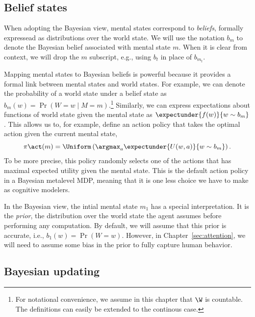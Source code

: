 \subsection{Belief states}

When adopting the Bayesian view, mental states correspond to \emph{beliefs}, formally expressead as distributions over the world state. We will use the notation $b_m$ to denote the Bayesian belief associated with mental state $m$. When it is clear from context, we will drop the $m$ subscript, e.g., using $b_t$ in place of $b_{m_t}$. 

Mapping mental states to Bayesian beliefs is powerful because it provides a formal link between mental states and world states. For example, we can denote the probability of a world state under a belief state as $b_m(w) = \Pr(W = w \mid M = m)$.\footnote{%
  For notational convenience, we assume in this chapter that $\W$ is countable. The definitions can easily be extended to the continous case.
} Similarly, we can express expectations about functions of world state given the mental state as $\expectunder{f(w)}{w \sim b_m}$. This allows us to, for example, define an action policy that takes the optimal action given the current mental state,
\begin{equation}
  \pi\act(m) = \Uniform \left(\argmax_a \expectunder{U(w, a)}{w \sim b_m}\right).
\end{equation}
%
To be more precise, this policy randomly selects one of the actions that has maximal expected utility given the mental state. This is the default action policy in a Bayesian metalevel MDP, meaning that it is one less choice we have to make as cognitive modelers.

In the Bayesian view, the intial mental state $m_1$ has a special interpretation. It is the \emph{prior}, the distribution over the world state the agent assumes before performing any computation. By default, we will assume that this prior is accurate, i.e., $b_1(w) = \Pr(W=w)$. However, in Chapter~\ref{sec:attention}, we will need to assume some bias in the prior to fully capture human behavior. 

\subsection{Bayesian updating}

